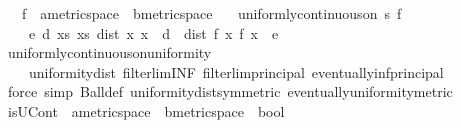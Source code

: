 \begin{isabellebody}
\ \ \ f\ {\isacharcolon}{\kern0pt}{\isacharcolon}{\kern0pt}\ {\isachardoublequoteopen}{\isacharprime}{\kern0pt}a{\isacharcolon}{\kern0pt}{\isacharcolon}{\kern0pt}metric{\isacharunderscore}{\kern0pt}space\ {\isasymRightarrow}\ {\isacharprime}{\kern0pt}b{\isacharcolon}{\kern0pt}{\isacharcolon}{\kern0pt}metric{\isacharunderscore}{\kern0pt}space{\isachardoublequoteclose}\isanewline
\ \ \ {\isachardoublequoteopen}uniformly{\isacharunderscore}{\kern0pt}continuous{\isacharunderscore}{\kern0pt}on\ s\ f\ {\isasymlongleftrightarrow}\isanewline
\ \ \ \ {\isacharparenleft}{\kern0pt}{\isasymforall}e{\isachargreater}{\kern0pt}{}{\isachardot}{\kern0pt}\ {\isasymexists}d{\isachargreater}{\kern0pt}{}{\isachardot}{\kern0pt}\ {\isasymforall}x{\isasymin}s{\isachardot}{\kern0pt}\ {\isasymforall}x{\isacharprime}{\kern0pt}{\isasymin}s{\isachardot}{\kern0pt}\ dist\ x{\isacharprime}{\kern0pt}\ x\ {\isacharless}{\kern0pt}\ d\ {\isasymlongrightarrow}\ dist\ {\isacharparenleft}{\kern0pt}f\ x{\isacharprime}{\kern0pt}{\isacharparenright}{\kern0pt}\ {\isacharparenleft}{\kern0pt}f\ x{\isacharparenright}{\kern0pt}\ {\isacharless}{\kern0pt}\ e{\isacharparenright}{\kern0pt}{\isachardoublequoteclose}\isanewline
%
\isadelimproof
\ \ %
\endisadelimproof
%
\isatagproof
{}\isamarkupfalse%
\ uniformly{\isacharunderscore}{\kern0pt}continuous{\isacharunderscore}{\kern0pt}on{\isacharunderscore}{\kern0pt}uniformity\isanewline
\ \ \ \ uniformity{\isacharunderscore}{\kern0pt}dist\ filterlim{\isacharunderscore}{\kern0pt}INF\ filterlim{\isacharunderscore}{\kern0pt}principal\ eventually{\isacharunderscore}{\kern0pt}inf{\isacharunderscore}{\kern0pt}principal\isanewline
\ \ \isamarkupfalse%
\ {\isacharparenleft}{\kern0pt}force\ simp{\isacharcolon}{\kern0pt}\ Ball{\isacharunderscore}{\kern0pt}def\ uniformity{\isacharunderscore}{\kern0pt}dist{\isacharbrackleft}{\kern0pt}symmetric{\isacharbrackright}{\kern0pt}\ eventually{\isacharunderscore}{\kern0pt}uniformity{\isacharunderscore}{\kern0pt}metric{\isacharparenright}{\kern0pt}%
\endisatagproof
{\isafoldproof}%
%
\isadelimproof
\isanewline
%
\endisadelimproof
\isanewline
{}\isamarkupfalse%
\ isUCont\ {\isacharcolon}{\kern0pt}{\isacharcolon}{\kern0pt}\ {\isachardoublequoteopen}{\isacharbrackleft}{\kern0pt}{\isacharprime}{\kern0pt}a{\isacharcolon}{\kern0pt}{\isacharcolon}{\kern0pt}metric{\isacharunderscore}{\kern0pt}space\ {\isasymRightarrow}\ {\isacharprime}{\kern0pt}b{\isacharcolon}{\kern0pt}{\isacharcolon}{\kern0pt}metric{\isacharunderscore}{\kern0pt}space{\isacharbrackright}{\kern0pt}\ {\isasymRightarrow}\ bool{\isachardoublequoteclose}\isanewline

\end{isabellebody}
